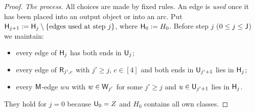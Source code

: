 \begin{proof}
\emph{The process.} All choices are made by fixed rules. An edge is \emph{used} once it has been placed into an
output object or into an arc. Put $\mathsf{H}_{j+1}:=\mathsf{H}_j\setminus\{\text{edges used at step }j\}$, where $\mathsf{H}_0:=H_0$.
Before step $j$ ($0\le j\le\mathsf{J}$) we maintain:
\begin{itemize}
\item[(Inv1)] every edge of $\mathsf{H}_j$ has both ends in $\mathsf{U}_j$;
\item[(Inv2)] every edge of $\mathsf{R}_{j',c}$ with $j'\ge j$, $c\in[4]$ and both ends in $\mathsf{U}_{j'+1}$ lies in $\mathsf{H}_j$;
\item[(Inv3)] every $\mathsf{M}$-edge $wu$ with $w\in\mathsf{W}_{j'}$ for some $j'\ge j$ and $u\in\mathsf{U}_{j'+1}$ lies in $\mathsf{H}_j$.
\end{itemize}
They hold for $j=0$ because $\mathsf{U}_0=Z$ and $H_0$ contains all own classes.


\end{proof}
